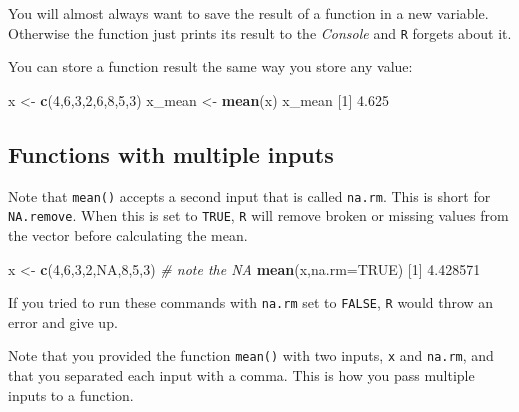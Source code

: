 \documentclass[
]{book}
\newenvironment{Shaded}{\begin{snugshade}}{\end{snugshade}}
\newcommand{\CommentTok}[1]{\textcolor[rgb]{0.56,0.35,0.01}{\textit{#1}}}
\newcommand{\DataTypeTok}[1]{\textcolor[rgb]{0.13,0.29,0.53}{#1}}
\newcommand{\DecValTok}[1]{\textcolor[rgb]{0.00,0.00,0.81}{#1}}
\newcommand{\FloatTok}[1]{\textcolor[rgb]{0.00,0.00,0.81}{#1}}
\newcommand{\KeywordTok}[1]{\textcolor[rgb]{0.13,0.29,0.53}{\textbf{#1}}}
\newcommand{\NormalTok}[1]{#1}
\newcommand{\OtherTok}[1]{\textcolor[rgb]{0.56,0.35,0.01}{#1}}
\newcommand{\StringTok}[1]{\textcolor[rgb]{0.31,0.60,0.02}{#1}}
\begin{document}
You will almost always want to save the result of a function in a new variable. Otherwise the function just prints its result to the \emph{Console} and \texttt{R} forgets about it.

You can store a function result the same way you store any value:

\begin{Shaded}
\begin{Highlighting}[]
\NormalTok{x <-}\StringTok{ }\KeywordTok{c}\NormalTok{(}\DecValTok{4}\NormalTok{,}\DecValTok{6}\NormalTok{,}\DecValTok{3}\NormalTok{,}\DecValTok{2}\NormalTok{,}\DecValTok{6}\NormalTok{,}\DecValTok{8}\NormalTok{,}\DecValTok{5}\NormalTok{,}\DecValTok{3}\NormalTok{) }
\NormalTok{x_mean <-}\StringTok{ }\KeywordTok{mean}\NormalTok{(x) }
\NormalTok{x_mean}
\NormalTok{[}\DecValTok{1}\NormalTok{] }\FloatTok{4.625}
\end{Highlighting}
\end{Shaded}

\hypertarget{functions-with-multiple-inputs}{%
\subsection*{Functions with multiple inputs}\label{functions-with-multiple-inputs}}

Note that \texttt{mean()} accepts a second input that is called \texttt{na.rm}. This is short for \texttt{NA.remove}. When this is set to \texttt{TRUE}, \texttt{R} will remove broken or missing values from the vector before calculating the mean.

\begin{Shaded}
\begin{Highlighting}[]
\NormalTok{x <-}\StringTok{ }\KeywordTok{c}\NormalTok{(}\DecValTok{4}\NormalTok{,}\DecValTok{6}\NormalTok{,}\DecValTok{3}\NormalTok{,}\DecValTok{2}\NormalTok{,}\OtherTok{NA}\NormalTok{,}\DecValTok{8}\NormalTok{,}\DecValTok{5}\NormalTok{,}\DecValTok{3}\NormalTok{)  }\CommentTok{# note the NA}
\KeywordTok{mean}\NormalTok{(x,}\DataTypeTok{na.rm=}\OtherTok{TRUE}\NormalTok{)}
\NormalTok{[}\DecValTok{1}\NormalTok{] }\FloatTok{4.428571}
\end{Highlighting}
\end{Shaded}

If you tried to run these commands with \texttt{na.rm} set to \texttt{FALSE}, \texttt{R} would throw an error and give up.

Note that you provided the function \texttt{mean()} with two inputs, \texttt{x} and \texttt{na.rm}, and that you separated each input with a comma. This is how you pass multiple inputs to a function.
\end{document}
